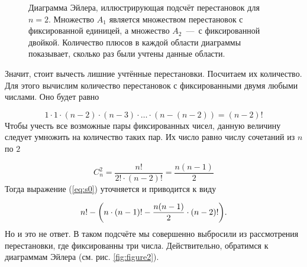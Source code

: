 \documentclass[12pt]{article}
\begin{document}
\begin{figure}[htbp]
	\centering
	\caption{Диаграмма Эйлера, иллюстрирующая подсчёт перестановок для $n=2$. Множество $A_1$ является множеством перестановок с фиксированной единицей, а множество $A_2$~\----~с фиксированной двойкой. Количество плюсов в каждой области диаграммы показывает, сколько раз были учтены данные области.}
	\label{fig:figure11}
\end{figure}
Значит, стоит вычесть лишние учтённые перестановки. Посчитаем их количество. Для этого вычислим количество перестановок с фиксированными двумя любыми числами. Оно будет равно

\begin{equation}
	1 \cdot 1 \cdot (n-2) \cdot (n-3) \cdot \ldots \cdot (n - (n-2)) = (n-2)!
\end{equation}
Чтобы учесть все возможные пары фиксированных чисел, данную величину следует умножить на количество таких пар. Их число равно числу сочетаний из $n$ по $2$

\begin{equation}
	C_n^2 = \dfrac{n!}{2! \cdot (n-2)!} = \dfrac{n (n-1)}{2}
\end{equation}
Тогда выражение (\ref{eq:s0}) уточняется и приводится к виду 

\begin{equation} \label{eq:s1}
	n! - \qty(n\cdot(n-1)! - \dfrac{n (n-1)}{2}\cdot (n-2)! ).
\end{equation}
Но и это не ответ. В таком подсчёте мы совершенно выбросили из рассмотрения перестановки, где фиксированны три числа. Действительно, обратимся к диаграммам Эйлера (см. рис. \ref{fig:figure2}).
\end{document}
